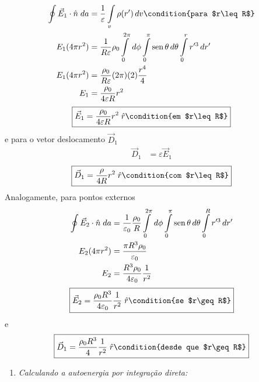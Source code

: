 \begin{prob}
\begin{sol}
		\begin{align}
			\begin{split}
				\oint \vec{E}_{1}\cdot\hat{n}\;da &=\frac{1}{\varepsilon}\int\limits_{v} \rho(r^{\prime})\,d{v}\condition{para $r\leq R$}\\
				E_{1}(4 \pi r^{2}) &= \frac{1}{R\varepsilon}\rho_{0}\int\limits_{0}^{2 \pi}\,d{\phi}\int\limits_{0}^{\pi}\sen \theta\,d{\theta}\int\limits_{0}^{r}r^{\prime 3}\,d{r^{\prime}}\\
				E_{1}(4 \pi r^{2}) &= \frac{\rho_{0}}{R\varepsilon}(2 \pi)(2)\frac{r^{4}}{4}\\
				E_{1} &= \frac{\rho_0}{4 \varepsilon R}r^{2}
			\end{split}
		\end{align}
		\begin{align}
			\boxed{
				\vec{E}_{1}=\frac{\rho_{0}}{4 \varepsilon R}r^{2} \; \hat{r}\condition{em $r\leq R$}
			}
		\end{align}
		e para o vetor deslocamento $\vec{D}_1$
		\begin{align}
			\vec{D}_{1}	&= \varepsilon \vec{E}_{1}
		\end{align}
		\begin{align}
			\boxed{
				\vec{D}_{1}=\frac{\rho}{4R}r^{2}\;\hat{r}\condition{com $r\leq R$}
			}	
		\end{align}
		Analogamente, para pontos externos
		\begin{align}
			\begin{split}
				\oint{\vec{E}_{2}}\cdot \hat{n}\; da &= \frac{1}{\varepsilon_0}\frac{\rho_0}{R}\int\limits_{0}^{2 \pi}\,d{\phi}\int\limits_{0}^{\pi}\operatorname{sen}\theta\,d{\theta}\int\limits_{0}^{R}r^{\prime 3}\,d{r^{\prime}}\\
				E_{2}(4 \pi r^{2}) &= \frac{\pi R^{3} \rho_0}{\varepsilon_0}\\
				E_{2} &= \frac{R^{3} \rho_0}{4 \varepsilon_0}\frac{1}{r^{2}}
			\end{split}
		\end{align}
		\begin{align}
			\boxed{
				\vec{E}_{2}=\frac{\rho_0 R^{3}}{4 \varepsilon_0}\frac{1}{r^{2}}\; \hat{r}\condition{se $r\geq R$}
			}
		\end{align}
		e
		\begin{align}
			\boxed{
				\vec{D}_1=\frac{\rho_0 R^{3}}{4}\frac{1}{r^{2}}\; \hat{r}\condition{desde que $r\geq R$}
			}
		\end{align}
		\begin{enumerate}[label=\alph *)]
			\item \textit{Calculando a autoenergia por integração direta:}	

\end{enumerate}
\end{sol}
\end{prob}
